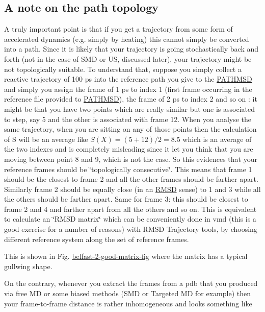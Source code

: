 \label{belfast-2_belfast-2-ab-sz-nowhere-fig}%
\hypertarget{belfast-2_belfast-2-ab-sz-nowhere-fig}{}%
 \hypertarget{belfast-2_pcvs-topo}{}\subsection{A note on the path topology}\label{belfast-2_pcvs-topo}
A truly important point is that if you get a trajectory from some form of accelerated dynamics (e.\+g. simply by heating) this cannot simply be converted into a path. Since it is likely that your trajectory is going stochastically back and forth (not in the case of S\+M\+D or U\+S, discussed later), your trajectory might be not topologically suitable. To understand that, suppose you simply collect a reactive trajectory of 100 ps into the reference path you give to the \hyperlink{PATHMSD}{P\+A\+T\+H\+M\+S\+D} and simply you assign the frame of 1 ps to index 1 (first frame occurring in the reference file provided to \hyperlink{PATHMSD}{P\+A\+T\+H\+M\+S\+D}), the frame of 2 ps to index 2 and so on \+: it might be that you have two points which are really similar but one is associated to step, say 5 and the other is associated with frame 12. When you analyse the same trajectory, when you are sitting on any of those points then the calculation of S will be an average like $ S(X)=(5+12)/2=8.5 $ which is an average of the two indexes and is completely misleading sinec it let you think that you are moving between point 8 and 9, which is not the case. So this evidences that your reference frames should be \char`\"{}topologically consecutive\char`\"{}. This means that frame 1 should be the closest to frame 2 and all the other frames should be farther apart. Similarly frame 2 should be equally close (in an \hyperlink{RMSD}{R\+M\+S\+D} sense) to 1 and 3 while all the others should be farther apart. Same for frame 3\+: this should be closest to frame 2 and 4 and farther apart from all the others and so on. This is equivalent to calculate an \char`\"{}\+R\+M\+S\+D matrix\char`\"{} which can be conveniently done in vmd (this is a good exercise for a number of reasons) with R\+M\+S\+D Trajectory tools, by choosing different reference system along the set of reference frames.

\label{belfast-2_belfast-2-good-matrix-fig}%
\hypertarget{belfast-2_belfast-2-good-matrix-fig}{}%
 This is shown in Fig. \hyperlink{belfast-2_belfast-2-good-matrix-fig}{belfast-\/2-\/good-\/matrix-\/fig} where the matrix has a typical gullwing shape.

On the contrary, whenever you extract the frames from a pdb that you produced via free M\+D or some biased methods (S\+M\+D or Targeted M\+D for example) then your frame-\/to-\/frame distance is rather inhomogeneous and looks something like

